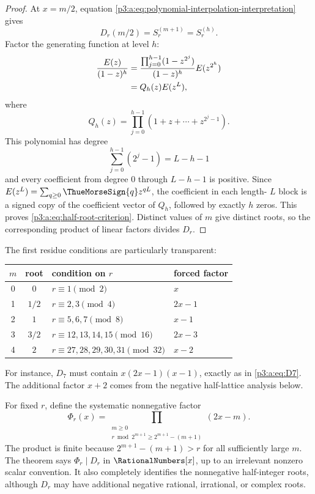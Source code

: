 \documentclass[11pt,oneside]{article}
\numberwithin{equation}{section}
\theoremstyle{definition}
\theoremstyle{remark}
\begin{document}
\begin{proof}
At \(x=m/2\), equation \eqref{p3:a:eq:polynomial-interpolation-interpretation}
gives
\[
 D_r(m/2)=S_r^{(m+1)}=S_r^{(h)}.
\]
Factor the generating function at level \(h\):
\begin{align}
 \frac{E(z)}{(1-z)^h}
 &=\frac{\prod_{j=0}^{h-1}(1-z^{2^j})}{(1-z)^h}
   E(z^{2^h})\notag\\
 &=Q_h(z)E(z^L),
 \label{p3:a:eq:Qh-factorization-preview}
\end{align}
where
\begin{equation}
 Q_h(z)=\prod_{j=0}^{h-1}
 (1+z+\cdots+z^{2^j-1}).
 \label{p3:a:eq:Qh-definition-preview}
\end{equation}
This polynomial has degree
\[
 \sum_{j=0}^{h-1}(2^j-1)=L-h-1
\]
and every coefficient from degree \(0\) through \(L-h-1\) is positive.
Since \(E(z^L)=\sum_{q\ge0}\ThueMorseSign{q}z^{qL}\), the coefficient in each length-
\(L\) block is a signed copy of the coefficient vector of \(Q_h\), followed by
exactly \(h\) zeros.  This proves \eqref{p3:a:eq:half-root-criterion}.  Distinct
values of \(m\) give distinct roots, so the corresponding product of linear
factors divides \(D_r\).
\end{proof}

The first residue conditions are particularly transparent:
\begin{center}
\begin{tabular}{ccll}
\toprule
\(m\) & root & condition on \(r\) & forced factor \\
\midrule
0 & \(0\) & \(r\equiv1\pmod2\) & \(x\) \\
1 & \(1/2\) & \(r\equiv2,3\pmod4\) & \(2x-1\) \\
2 & \(1\) & \(r\equiv5,6,7\pmod8\) & \(x-1\) \\
3 & \(3/2\) & \(r\equiv12,13,14,15\pmod{16}\) & \(2x-3\) \\
4 & \(2\) & \(r\equiv27,28,29,30,31\pmod{32}\) & \(x-2\) \\
\bottomrule
\end{tabular}
\end{center}
For instance, \(D_7\) must contain \(x(2x-1)(x-1)\), exactly as in
\eqref{p3:a:eq:D7}.  The additional factor \(x+2\) comes from the negative
half-lattice analysis below.

For fixed \(r\), define the systematic nonnegative factor
\begin{equation}
 \Phi_r(x)=
 \prod_{\substack{m\ge0\\
 r\bmod 2^{m+1}\ge2^{m+1}-(m+1)}}(2x-m).
 \label{p3:a:eq:Phi-factor}
\end{equation}
The product is finite because \(2^{m+1}-(m+1)>r\) for all sufficiently large
\(m\).  The theorem says \(\Phi_r\mid D_r\) in \(\RationalNumbers[x]\), up to an
irrelevant nonzero scalar convention.  It also completely identifies the
nonnegative half-integer roots, although \(D_r\) may have additional
negative rational, irrational, or complex roots.
\end{document}
